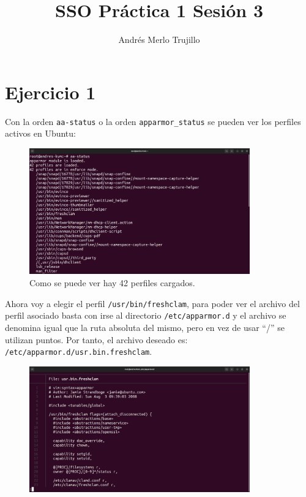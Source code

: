\documentclass{article}
\title{SSO Práctica 1 Sesión 3}
\author{Andrés Merlo Trujillo}
\date{}
\begin{document}
\maketitle

%

\section*{Ejercicio 1}
Con la orden \verb|aa-status| o la orden \verb|apparmor_status| se pueden ver los perfiles activos en Ubuntu:

\begin{figure}[H]
    \centering
    \includegraphics[width=0.85\textwidth]{imagenes/s3-aa-status.png}
    \caption{Como se puede ver hay 42 perfiles cargados.}
\end{figure}


Ahora voy a elegir el perfil \verb|/usr/bin/freshclam|, para poder ver el archivo del perfil asociado basta con irse al directorio \verb|/etc/apparmor.d| y el archivo se denomina igual que la ruta absoluta del mismo, pero en vez de usar ``/'' se utilizan puntos. Por tanto, el archivo deseado es: \verb|/etc/apparmor.d/usr.bin.freshclam|.

\begin{figure}[H]
    \centering
    \includegraphics[width=0.85\textwidth]{imagenes/Captura desde 2022-10-18 16-13-59.png}
\end{figure}
\end{document}
